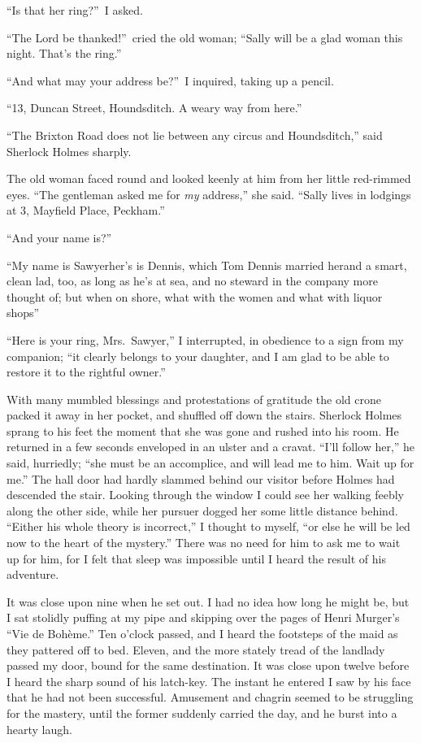 \documentclass[12pt,english]{book}
\begin{document}
{}``Is that her ring?''\ I asked.

{}``The Lord be thanked!''\ cried the old woman; {}``Sally will
be a glad woman this night. That's the ring.''

{}``And what may your address be?''\ I inquired, taking up a pencil.

{}``13, Duncan Street, Houndsditch. A weary way from here.''

{}``The Brixton Road does not lie between any circus and Houndsditch,''
said Sherlock Holmes sharply.

The old woman faced round and looked keenly at him from her little
red-rimmed eyes. {}``The gentleman asked me for \textit{my} address,''
she said. {}``Sally lives in lodgings at 3, Mayfield Place, Peckham.''

{}``And your name is\mdsh{---}?''

{}``My name is Sawyer\mdsh{---}her's is Dennis, which Tom Dennis
married her\mdsh{---}and a smart, clean lad, too, as long as he's
at sea, and no steward in the company more thought of; but when on
shore, what with the women and what with liquor shops\mdsh{---}''

{}``Here is your ring, Mrs.\ Sawyer,'' I interrupted, in obedience
to a sign from my companion; {}``it clearly belongs to your daughter,
and I am glad to be able to restore it to the rightful owner.''

With many mumbled blessings and protestations of gratitude the old
crone packed it away in her pocket, and shuffled off down the stairs.
Sherlock Holmes sprang to his feet the moment that she was gone and
rushed into his room. He returned in a few seconds enveloped in an
ulster and a cravat. {}``I'll follow her,'' he said, hurriedly;
{}``she must be an accomplice, and will lead me to him. Wait up for
me.'' The hall door had hardly slammed behind our visitor before
Holmes had descended the stair. Looking through the window I could
see her walking feebly along the other side, while her pursuer dogged
her some little distance behind. {}``Either his whole theory is incorrect,''
I thought to myself, {}``or else he will be led now to the heart
of the mystery.'' There was no need for him to ask me to wait up
for him, for I felt that sleep was impossible until I heard the result
of his adventure.

It was close upon nine when he set out. I had no idea how long he
might be, but I sat stolidly puffing at my pipe and skipping over
the pages of Henri Murger's {}``Vie de Bohème.'' Ten o'clock passed,
and I heard the footsteps of the maid as they pattered off to bed.
Eleven, and the more stately tread of the landlady passed my door,
bound for the same destination. It was close upon twelve before I
heard the sharp sound of his latch-key. The instant he entered I saw
by his face that he had not been successful. Amusement and chagrin
seemed to be struggling for the mastery, until the former suddenly
carried the day, and he burst into a hearty laugh.
\end{document}

